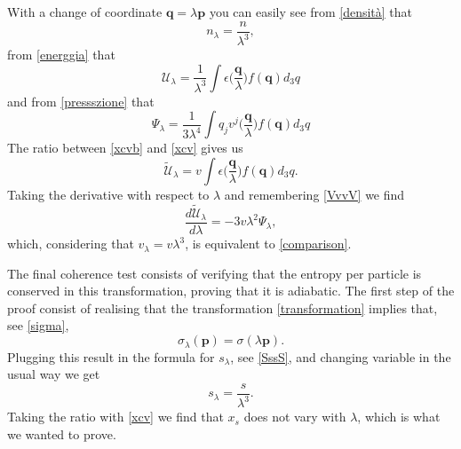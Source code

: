 \documentclass[useAMS,usenatbib,prd,twocolumn,nofootinbib]{revtex4-1}
\newcommand{\vect}[1]{\mathbf{{#1}}}
\begin{document}
With a change of coordinate $\vect{q} = \lambda \vect{p}$ you can easily see from \eqref{densità} that
\begin{equation}\label{xcv}
n_\lambda = \dfrac{n}{\lambda^3} ,
\end{equation} 
from \eqref{energgia} that
\begin{equation}\label{xcvb}
\mathcal{U}_\lambda = \dfrac{1}{\lambda^3} \int \epsilon \bigg( \dfrac{\vect{q}}{\lambda} \bigg) f(\vect{q}) d_3 q
\end{equation}
and from \eqref{pressszione} that
\begin{equation}
\Psi_\lambda = \dfrac{1}{3 \lambda^4} \int q_j v^j \bigg( \dfrac{\vect{q}}{\lambda} \bigg) f(\vect{q}) d_3 q 
\end{equation}
The ratio between \eqref{xcvb} and \eqref{xcv} gives us
\begin{equation}
\tilde{\mathcal{U}}_\lambda = v \int \epsilon \bigg( \dfrac{\vect{q}}{\lambda} \bigg) f(\vect{q}) d_3 q .
\end{equation}
Taking the derivative with respect to $\lambda$ and remembering \eqref{VvvV} we find
\begin{equation}
\dfrac{d \tilde{\mathcal{U}}_\lambda}{d \lambda} = -3v \lambda^2 \Psi_\lambda,
\end{equation}
which, considering that $v_\lambda = v \lambda^3$, is equivalent to \eqref{comparison}.

The final coherence test consists of verifying that the entropy per particle is conserved in this transformation, proving that it is adiabatic. The first step of the proof consist of realising that the transformation \eqref{transformation} implies that, see \eqref{sigma},
\begin{equation}
\sigma_\lambda (\vect{p}) = \sigma (\lambda \vect{p}).
\end{equation}
Plugging this result in the formula for $s_\lambda$, see \eqref{SssS}, and changing variable in the usual way we get
\begin{equation}\label{qwertyuioopljhggf}
s_\lambda = \dfrac{s}{\lambda^3} .
\end{equation}
Taking the ratio with \eqref{xcv} we find that $x_s$ does not vary with $\lambda$, which is what we wanted to prove.










\label{lastpage}
\end{document}
